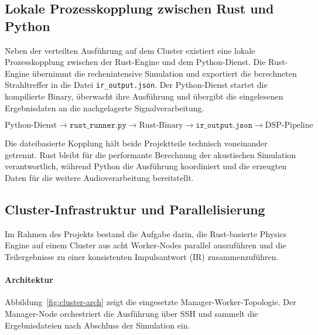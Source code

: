 \subsection{Lokale Prozesskopplung zwischen Rust und Python}
\label{subsec:lokale_prozesskopplung}

Neben der verteilten Ausführung auf dem Cluster existiert eine lokale
Prozesskopplung zwischen der Rust-Engine und dem Python-Dienst. Die
Rust-Engine übernimmt die rechenintensive Simulation und exportiert die
berechneten Strahltreffer in die Datei \texttt{ir\_output.json}. Der
Python-Dienst startet die kompilierte Binary, überwacht ihre Ausführung und
übergibt die eingelesenen Ergebnisdaten an die nachgelagerte
Signalverarbeitung.

\[
    \text{Python-Dienst}
    \rightarrow
    \texttt{rust\_runner.py}
    \rightarrow
    \text{Rust-Binary}
    \rightarrow
    \texttt{ir\_output.json}
    \rightarrow
    \text{DSP-Pipeline}
\]

Die dateibasierte Kopplung hält beide Projektteile technisch voneinander
getrennt. Rust bleibt für die performante Berechnung der akustischen Simulation
verantwortlich, während Python die Ausführung koordiniert und die erzeugten
Daten für die weitere Audioverarbeitung bereitstellt.

\subsection{Cluster-Infrastruktur und Parallelisierung}
\label{subsec:cluster_architektur}

Im Rahmen des Projekts bestand die Aufgabe darin, die Rust-basierte Physics Engine auf einem Cluster aus acht Worker-Nodes parallel auszuführen und die Teilergebnisse zu einer konsistenten Impulsantwort (IR) zusammenzuführen.

\paragraph{Architektur}
Abbildung~\ref{fig:cluster-arch} zeigt die eingesetzte Manager-Worker-Topologie. Der Manager-Node orchestriert die Ausführung über SSH und sammelt die Ergebnisdateien nach Abschluss der Simulation ein.

